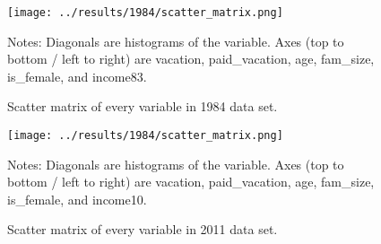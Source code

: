 \documentclass{article}
\begin{document}
    \setcounter{figure}{0} \renewcommand{\thefigure}{A.\arabic{figure}}
    \begin{figure}[h]
    \centering
    \hspace*{-1.2in}
    \texttt{[image: ../results/1984/scatter\_matrix.png]}
    \hspace*{-1.2in}
    \caption{Scatter matrix of every variable in 1984 data set.}
    \label{scatter-1984}
      Notes: Diagonals are histograms of the variable. Axes (top to bottom /
      left to right) are vacation, paid\_vacation, age, fam\_size, is\_female,
      and income83.
    \end{figure}
    \begin{figure}[h]
    \centering
    \hspace*{-1.2in}
    \texttt{[image: ../results/1984/scatter\_matrix.png]}
    \hspace*{-1.2in}
    \caption{Scatter matrix of every variable in 2011 data set.}
    \label{scatter-1984}
      Notes: Diagonals are histograms of the variable. Axes (top to bottom /
      left to right) are vacation, paid\_vacation, age, fam\_size, is\_female,
      and income10.
    \end{figure}
\end{document}
